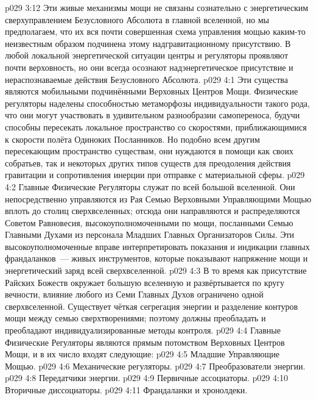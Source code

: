 \vs p029 3:12 Эти живые механизмы мощи не связаны сознательно с энергетическим сверхуправлением Безусловного Абсолюта в главной вселенной, но мы предполагаем, что их вся почти совершенная схема управления мощью каким\hyp{}то неизвестным образом подчинена этому надгравитационному присутствию. В любой локальной энергетической ситуации центры и регуляторы проявляют почти верховность, но они всегда осознают надэнергетическое присутствие и нераспознаваемые действия Безусловного Абсолюта.
\vs p029 4:1 Эти существа являются мобильными подчинёнными Верховных Центров Мощи. Физические регуляторы наделены способностью метаморфозы индивидуальности такого рода, что они могут участвовать в удивительном разнообразии самопереноса, будучи способны пересекать локальное пространство со скоростями, приближающимися к скорости полёта Одиноких Посланников. Но подобно всем другим пересекающим пространство существам, они нуждаются в помощи как своих собратьев, так и некоторых других типов существ для преодоления действия гравитации и сопротивления инерции при отправке с материальной сферы.
\vs p029 4:2 Главные Физические Регуляторы служат по всей большой вселенной. Они непосредственно управляются из Рая Семью Верховными Управляющими Мощью вплоть до столиц сверхвселенных; отсюда они направляются и распределяются Советом Равновесия, высокоуполномоченными по мощи, посланными Семью Главными Духами из персонала Младших Главных Организаторов Силы. Эти высокоуполномоченные вправе интерпретировать показания и индикации главных франдаланков~--- живых инструментов, которые показывают напряжение мощи и энергетический заряд всей сверхвселенной.
\vs p029 4:3 В то время как присутствие Райских Божеств окружает большую вселенную и развёртывается по кругу вечности, влияние любого из Семи Главных Духов ограничено одной сверхвселенной. Существует чёткая сегрегация энергии и разделение контуров мощи между семью сверхтворениями; поэтому должны преобладать и преобладают индивидуализированные методы контроля.
\vs p029 4:4 \pc Главные Физические Регуляторы являются прямым потомством Верховных Центров Мощи, и в их число входят следующие:
\vs p029 4:5 Младшие Управляющие Мощью.
\vs p029 4:6 Механические регуляторы.
\vs p029 4:7 Преобразователи энергии.
\vs p029 4:8 Передатчики энергии.
\vs p029 4:9 Первичные ассоциаторы.
\vs p029 4:10 Вторичные диссоциаторы.
\vs p029 4:11 Франдаланки и хронолдеки.
